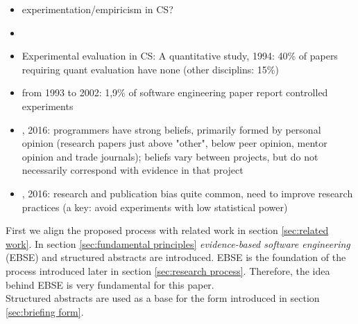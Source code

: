 \begin{itemize}
\item experimentation/empiricism in CS?
\item {}
\item Experimental evaluation in CS: A quantitative study, 1994: 40\% of papers requiring quant evaluation have none (other disciplins: 15\%)
\item {} from 1993 to 2002: 1,9\% of software engineering paper report controlled experiments
\item {}, 2016: programmers have strong beliefs, primarily formed by personal opinion (research papers just above "other", below peer opinion, mentor opinion and trade journals); beliefs vary between projects, but do not necessarily correspond with evidence in that project
\item {}, 2016: research and publication bias quite common, need to improve research practices (a key: avoid experiments with low statistical power)
\end{itemize}

First we align the proposed process with related work in section \ref{sec:related work}. In section \ref{sec:fundamental principles} \emph{evidence-based software engineering} (EBSE) and structured abstracts are introduced. EBSE is the foundation of the process introduced later in section \ref{sec:research process}. Therefore, the idea behind EBSE is very fundamental  for this paper.\\
Structured abstracts are used as a base for the form introduced in section \ref{sec:briefing form}.\\















